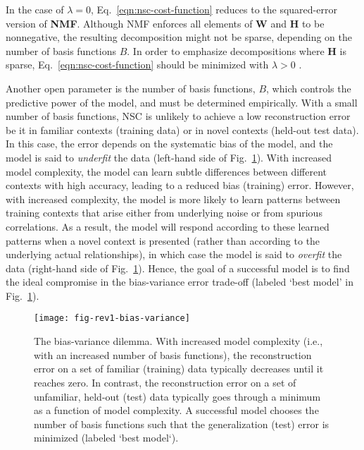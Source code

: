 In the case of $\lambda = 0$, Eq.~\ref{eqn:nsc-cost-function}
reduces to the squared-error version of \textbf{\ac{NMF}}.
Although \ac{NMF} enforces all elements of \textbf{W} and \textbf{H}
to be nonnegative,
the resulting decomposition might not be sparse,
depending on the number of basis functions $B$.
In order to emphasize decompositions where \textbf{H} is sparse,
Eq.~\ref{eqn:nsc-cost-function} should be minimized 
with $\lambda > 0$ \cite{Hoyer2002}.

Another open parameter is the number of basis functions, $B$, 
which controls the predictive power of the model,
and must be determined empirically.
With a small number of basis functions,
\ac{NSC} is unlikely to achieve a low reconstruction error
be it in familiar contexts (training data) or in novel contexts
(held-out test data).
In this case, the error depends on the systematic bias of the model,
and the model is said to \emph{underfit} the data
(left-hand side of Fig.~\ref{fig:nsc-bias-variance-dilemma}).
With increased model complexity,
the model can learn subtle differences 
between different contexts with high accuracy,
leading to a reduced bias (training) error.
However, with increased complexity, the model is more likely to learn
patterns between training contexts that arise either from underlying noise
or from spurious correlations. As a result,
the model will respond according to
these learned patterns when a novel context is presented
(rather than according to the underlying actual relationships), 
in which case the model is said to \emph{overfit} the data
(right-hand side of Fig.~\ref{fig:nsc-bias-variance-dilemma}).
Hence, the goal of a successful model is to find the ideal compromise
in the bias-variance error trade-off \cite{Beyeler2017}
(labeled `best model' in Fig.~\ref{fig:nsc-bias-variance-dilemma}).

\begin{figure}[h]
	\centering
	\texttt{[image: fig-rev1-bias-variance]}
    \caption{The bias-variance dilemma.
    With increased model complexity 
    (i.e., with an increased number of basis functions), 
    the reconstruction error on a set
    of familiar (training) data typically decreases until it reaches zero.
    In contrast, the reconstruction error on a set of unfamiliar, held-out
    (test) data typically goes through a minimum as a function of model complexity.
    A successful model chooses the number of basis functions such that the
    generalization (test) error is minimized (labeled `best model`).}
	\label{fig:nsc-bias-variance-dilemma}
\end{figure}

